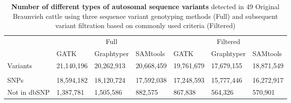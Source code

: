 \documentclass[../main.tex]{subfiles}
\begin{document}
\begin{landscape}
\begin{table}
    \vspace{10mm} 
    \centering
    \caption[Number of different types of autosomal sequence variants]{\textbf{Number of different types of autosomal sequence variants} detected in 49 Original Braunvieh cattle using three sequence variant genotyping methods (Full) and subsequent variant filtration based on commonly used criteria (Filtered)}
    \vspace{10mm}
    \begin{tabular}{|l|l|l|l|l|l|l|} 
    \cline{2-7}
    \multicolumn{1}{l|}{} & \multicolumn{3}{c|}{\multirow{2}{*}{Full}}                                      & \multicolumn{3}{c|}{\multirow{2}{*}{Filtered}}                                   \\
    \multicolumn{1}{l|}{} & \multicolumn{3}{l|}{}                                                           & \multicolumn{3}{l|}{}                                                            \\ 
    \cline{2-7}
    \multicolumn{1}{l|}{} & \multirow{2}{*}{GATK} & \multirow{2}{*}{Graphtyper} & \multirow{2}{*}{SAMtools} & \multirow{2}{*}{GATK} & \multirow{2}{*}{Graphtyper} & \multirow{2}{*}{SAMtools}  \\ 
    \cline{1-1}
                          &                       &                             &                           &                       &                             &                            \\ 
    \hline
    Variants              & 21,140,196            & 20,262,913                  & 20,668,459                & 19,761,679            & 17,679,155                  & 18,871,549                 \\ 
    \hline
    \multicolumn{7}{|l|}{}                                                                                                                                                                     \\ 
    \hline
    SNPs                  & 18,594,182            & 18,120,724                  & 17,592,038                & 17,248,593            & 15,777,446                  & 16,272,917                 \\ 
    \hline
    Not in dbSNP          & 1,387,781             & 1,505,586                   & 882,575                   & 867,838               & 564,326                     & 570,901                    \\ 

\end{tabular}
\end{table}
\end{landscape}
\end{document}
